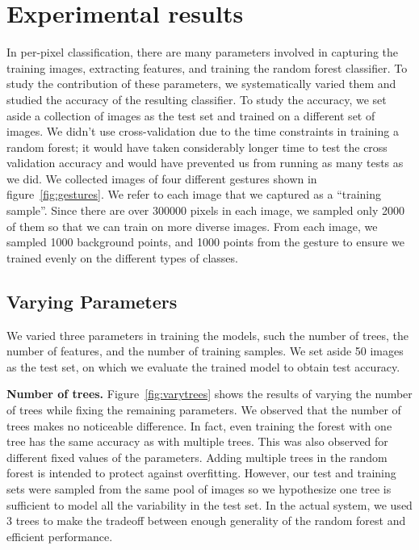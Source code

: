 \section{Experimental results}
\label{sec: experiments}

In per-pixel classification, there are many parameters involved in capturing the training images, extracting features, and training the random forest classifier. To study the contribution of these parameters, we systematically varied them and studied the accuracy of the resulting classifier. To study the accuracy, we set aside a collection of images as the test set and trained on a different set of images. We didn't use cross-validation due to the time constraints in training a random forest; it would have taken considerably longer time to test the cross validation accuracy and would  have prevented us from running as many tests as we did.
We collected images of four different gestures shown in figure~\ref{fig:gestures}. We refer to each image that we captured as a ``training sample''. Since there are over 300000 pixels in each image, we sampled only 2000 of them so that we can train on more diverse images. From each image, we sampled 1000 background points, and 1000 points from the gesture to ensure we trained evenly on the different types of classes.
\subsection{Varying Parameters} 
We varied three parameters in training the models, such the number of trees, the number of features, and the number of training samples. We set aside 50 images as the test set, on which we evaluate the trained model to obtain test accuracy. 

\textbf{Number of trees.} Figure~\ref{fig:varytrees} shows the results of varying the number of trees while fixing the remaining parameters. We observed that the number of trees makes no noticeable difference. In fact, even training the forest with one tree has the same accuracy as with multiple trees. This was also observed for different fixed values of the parameters. Adding multiple trees in the random forest is intended to protect against overfitting. However, our test and training sets were sampled from the same pool of images so we hypothesize one tree is sufficient to model all the variability in the test set. In the actual system, we used 3 trees to make the tradeoff between enough generality of the random forest and efficient performance. 

